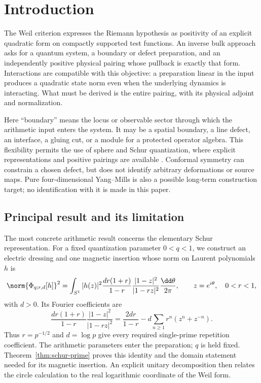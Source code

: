 \section{Introduction}\label{sec:intro}
The Weil criterion expresses the Riemann hypothesis as positivity of an
explicit quadratic form on compactly supported test functions. An inverse
bulk approach asks for a quantum system, a boundary or defect preparation,
and an independently positive physical pairing whose pullback is exactly
that form. Interactions are compatible with this objective: a preparation
linear in the input produces a quadratic state norm even when the
underlying dynamics is interacting. What must be derived is the entire
pairing, with its physical adjoint and normalization.

Here ``boundary'' means the locus or observable sector through which
the arithmetic input enters the system. It may be a spatial boundary,
a line defect, an interface, a gluing cut, or a module for a protected
operator algebra. This flexibility permits the use of sphere and Schur
quantization, where explicit representations and positive pairings are
available \cite{Sphere,Schur,RG}. Conformal symmetry can constrain a chosen
defect, but does not identify arbitrary deformations or source maps.
Pure four-dimensional Yang--Mills is also a possible long-term construction
target; no identification with it is made in this paper.

\clearpage
\subsection{Principal result and its limitation}
The most concrete arithmetic result concerns the elementary Schur
representation. For a fixed quantization parameter $0<q<1$, we construct
an electric dressing and one magnetic insertion whose norm on Laurent
polynomials $h$ is
\begin{equation}\label{eq:intro-norm}
 \norm{\Phi_{q;r,d}[h]}^2
 =\int_{S^1}|h(z)|^2
 \frac{dr(1+r)}{1-r}\frac{|1-z|^2}{|1-rz|^2}\frac{\dd\theta}{2\pi},
 \qquad z=e^{i\theta},\quad 0<r<1,
\end{equation}
with $d>0$. Its Fourier coefficients are
\begin{equation}\label{eq:intro-coeff}
 \frac{dr(1+r)}{1-r}\frac{|1-z|^2}{|1-rz|^2}
 =\frac{2dr}{1-r}-d\sum_{n\geq1}r^n(z^n+z^{-n}).
\end{equation}
Thus $r=p^{-1/2}$ and $d=\log p$ give every required single-prime
repetition coefficient. The arithmetic parameters enter the preparation;
$q$ is held fixed. Theorem~\ref{thm:schur-prime} proves this identity and
the domain statement needed for its magnetic insertion. An explicit
unitary decomposition then relates the circle calculation to the real
logarithmic coordinate of the Weil form.

